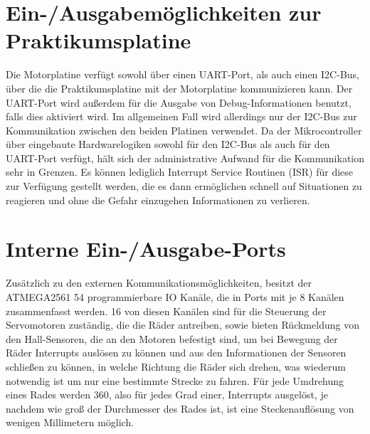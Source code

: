 \section{Ein-/Ausgabemöglichkeiten zur Praktikumsplatine}
Die Motorplatine verfügt sowohl über einen UART-Port, als auch einen I2C-Bus, über die
die Praktikumsplatine mit der Motorplatine kommunizieren kann. Der UART-Port wird außerdem
für die Ausgabe von Debug-Informationen benutzt, falls dies aktiviert wird. Im allgemeinen
Fall wird allerdings nur der I2C-Bus zur Kommunikation zwischen den beiden Platinen verwendet.
Da der Mikrocontroller über eingebaute Hardwarelogiken sowohl für den I2C-Bus als auch für
den UART-Port verfügt, hält sich der administrative Aufwand für die Kommunikation sehr in
Grenzen. Es können lediglich Interrupt Service Routinen (ISR) für diese zur Verfügung gestellt
werden, die es dann ermöglichen schnell auf Situationen zu reagieren und ohne die Gefahr
einzugehen Informationen zu verlieren.
\section{Interne Ein-/Ausgabe-Ports}
Zusätzlich zu den externen Kommunikationsmöglichkeiten, besitzt der ATMEGA2561 54
programmierbare IO Kanäle, die in Ports mit je 8 Kanälen zusammenfasst werden. 16 von diesen
Kanälen sind für die Steuerung der Servomotoren zuständig, die die Räder antreiben, sowie bieten
Rückmeldung von den Hall-Sensoren, die an den Motoren befestigt sind, um bei Bewegung der Räder
Interrupts auslösen zu können und aus den Informationen der Sensoren schließen zu können, in welche
Richtung die Räder sich drehen, was wiederum notwendig ist um nur eine bestimmte Strecke zu fahren.
Für jede Umdrehung eines Rades werden 360, also für jedes Grad einer, Interrupts ausgelöst, je
nachdem wie groß der Durchmesser des Rades ist, ist eine Steckenauflösung  von wenigen Millimetern
möglich.
